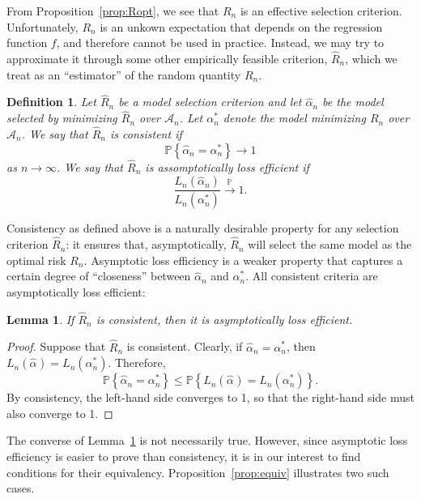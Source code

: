 \documentclass[12pt, letter paper]{article}
\newcommand{\1}{\mathmybb{1}}
\newtheorem{definition}{Definition}[section]
\newtheorem{lemma}[proposition]{Lemma}
\newcommand{\0}{\emptyset}
\newcommand{\prob}{\mathbb{P}}
\newcommand{\paren}[1]{\left(#1 \right)}
\newcommand{\set}[1]{\left\{ #1 \right\}}
\newcommand{\Acal}{\mathcal{A}_{n}}
\newcommand{\Loss}[1]{L_{n}\paren{#1}}
\newcommand{\alphahat}[1]{\hat{\alpha}^{#1}}
\begin{document}
From Proposition~\ref{prop:Ropt}, we see that \(R_{n}\) is an effective selection criterion. Unfortunately, \(R_{n}\) is an unkown expectation that depends on the regression function \(f\), and therefore cannot be used in practice. Instead, we may try to approximate it through some other empirically feasible criterion, \(\hat{R}_{n}\), which we treat as an ``estimator'' of the random quantity \(R_{n}\).

\begin{definition}\label{def:consistency97}
    Let \(\hat{R}_{n}\) be a model selection criterion and let \(\alphahat{}_{n}\) be the model selected by minimizing \(\hat{R}_{n}\) over \(\Acal\). Let \(\alpha^{*}_{n}\) denote the model minimizing \(R_{n}\) over \(\Acal\). We say that \(\hat{R}_{n}\) is {consistent} if 
    \[\prob\set{\alphahat{}_{n} = \alpha^{*}_{n}}\to 1\]
    as \(n\to\infty\). We say that \(\hat{R}_{n}\) is {assomptotically loss efficient} if 
    \[\frac{L_{n}(\alphahat{}_{n})}{L_{n}(\alpha^{*}_{n})}\xrightarrow{\prob} 1.\]
\end{definition}

Consistency as defined above is a naturally desirable property for any selection criterion \(\hat{R}_{n}\): it ensures that, asymptotically, \(\hat{R}_{n}\) will select the same model as the optimal risk \(R_{n}\). Asymptotic loss efficiency is a weaker property that captures a certain degree of ``closeness'' between \(\alphahat{}_{n}\) and \(\alpha^{*}_{n}\). All consistent criteria are asymptotically loss efficient:

\begin{lemma}\label{lemm:implication}
    If \(\hat{R}_{n}\) is consistent, then it is asymptotically loss efficient.
\end{lemma}

\begin{proof}
    Suppose that \(\hat{R}_{n}\) is consistent. Clearly, if \(\alphahat{}_{n} = \alpha^{*}_{n}\), then \(\Loss{\alphahat{}} = \Loss{\alpha^{*}_{n}}\). Therefore, 
    \[\prob\set{\alphahat{}_{n} = \alpha^{*}_{n}}\leq \prob\set{\Loss{\alphahat{}} = \Loss{\alpha^{*}_{n}}}.\]
    By consistency, the left-hand side converges to 1, so that the right-hand side must also converge to 1.
\end{proof}

The converse of Lemma~\ref{lemm:implication} is not necessarily true. However, since asymptotic loss efficiency is easier to prove than consistency, it is in our interest to find conditions for their equivalency. Proposition~\ref{prop:equiv} illustrates two such cases.
\end{document}
